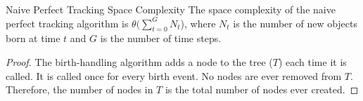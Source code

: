 \begin{theorem}{Naive Perfect Tracking Space Complexity}
\label{thm:perfect-tracking-space}
The space complexity of the naive perfect tracking algorithm is $\mathcal{\theta}(\sum_{t=0}^{G} N_t$), where $N_t$ is the number of new objects born at time $t$ and $G$ is the number of time steps.
\end{theorem}

\begin{proof}
\label{prf:perfect-tracking-space}
The birth-handling algorithm adds a node to the tree ($T$) each time it is called.
It is called once for every birth event.
No nodes are ever removed from $T$.
Therefore, the number of nodes in $T$ is the total number of nodes ever created.
\end{proof}
